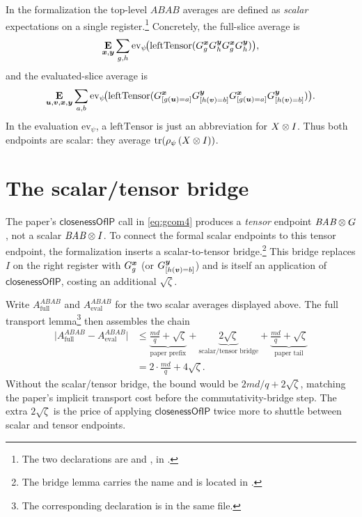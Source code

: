 \documentclass{article}
\newcommand{\ABAB}{\textit{ABAB}}
\newcommand{\BAB}{\textit{BAB}}
\newcommand{\closenessOfIP}{\textsf{closenessOfIP}}
\begin{document}
In the formalization the top-level $\ABAB$ averages are defined as
\emph{scalar} expectations on a single register.\footnote{The two
declarations are  and
, in
.}
Concretely, the full-slice average is
\[
  \mathop{\bf E\/}_{{\boldsymbol{x}},\boldsymbol{y}} \sum_{g,h}
    \mathrm{ev}_{\psi}\!\bigl(  \mathrm{leftTensor}(G^{{\boldsymbol{x}}}_g G^{\boldsymbol{y}}_h G^{{\boldsymbol{x}}}_g G^{\boldsymbol{y}}_h)
    \bigr),
\]
and the evaluated-slice average is
\[
  \mathop{\bf E\/}_{\boldsymbol{u},\boldsymbol{v},{\boldsymbol{x}},\boldsymbol{y}} \sum_{a,b}
    \mathrm{ev}_{\psi}\!\bigl(  \mathrm{leftTensor}(    G^{{\boldsymbol{x}}}_{[g(\boldsymbol{u})=a]} G^{\boldsymbol{y}}_{[h(\boldsymbol{v})=b]}
        G^{{\boldsymbol{x}}}_{[g(\boldsymbol{u})=a]} G^{\boldsymbol{y}}_{[h(\boldsymbol{v})=b]}
      )
    \bigr).
\]
In the evaluation $\mathrm{ev}_\psi$, a $\mathrm{leftTensor}$ is just
an abbreviation for $X \otimes I$. Thus both endpoints are scalar: they
average $\mathrm{tr}(\rho_{\psi}\, (X \otimes I))$.

\section{The scalar/tensor bridge}

The paper's $\closenessOfIP$ call in \eqref{eq:gcom4} produces a
\emph{tensor} endpoint $\BAB \ot G$, not a scalar $\BAB \ot I$. To
connect the formal scalar endpoints to this tensor endpoint, the
formalization inserts a scalar-to-tensor bridge.\footnote{The bridge
lemma carries the name
and is located in
.}  This bridge
replaces $I$ on the right register with $G^{{\boldsymbol{x}}}_g$ (or
$G^{\boldsymbol{y}}_{[h(\boldsymbol{v})=b]}$) and is itself an application of
$\closenessOfIP$, costing an additional $\sqrt{\zeta}$.

Write $A^{\ABAB}_{\text{full}}$ and $A^{\ABAB}_{\text{eval}}$ for the
two scalar averages displayed above. The full transport
lemma\footnote{The corresponding declaration is
 in the same file.} then
assembles the chain
\begin{align*}
  \bigl|
    A^{\ABAB}_{\text{full}}
    - A^{\ABAB}_{\text{eval}}
  \bigr|
  &\leq
  \underbrace{\frac{md}{q} + \sqrt{\zeta}}_{\text{paper prefix}}
  +
  \underbrace{2\sqrt{\zeta}}_{\text{scalar/tensor bridge}}
  +
  \underbrace{\frac{md}{q} + \sqrt{\zeta}}_{\text{paper tail}} \\
  &= 2\cdot\frac{md}{q} + 4\sqrt{\zeta}.
\end{align*}
Without the scalar/tensor bridge, the bound would be
$2md/q + 2\sqrt{\zeta}$, matching the paper's implicit transport
cost before the commutativity-bridge step. The extra $2\sqrt{\zeta}$
is the price of applying $\closenessOfIP$ twice more to shuttle
between scalar and tensor endpoints.
\end{document}
